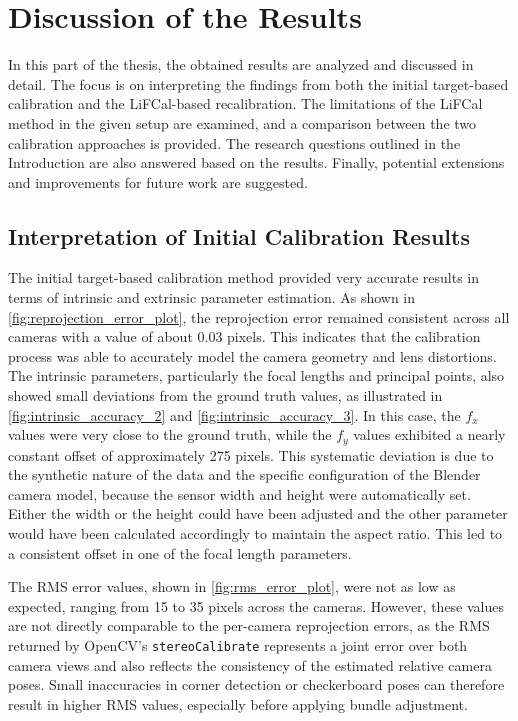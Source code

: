 \documentclass[12pt]{scrartcl}
\begin{document}
\newpage 
\section{Discussion of the Results} \label{Chapter 5}

In this part of the thesis, the obtained results are analyzed and discussed in detail. The focus is on interpreting the findings from both the initial target-based calibration and the LiFCal-based recalibration. The limitations of the LiFCal method in the given setup are examined, and a comparison between the two calibration approaches is provided. The research questions outlined in the Introduction are also answered based on the results. Finally, potential extensions and improvements for future work are suggested.

\subsection{Interpretation of Initial Calibration Results}

The initial target-based calibration method provided very accurate results in terms of intrinsic and extrinsic parameter estimation. As shown in \autoref{fig:reprojection_error_plot}, the reprojection error remained consistent across all cameras with a value of about 0.03 pixels. This indicates that the calibration process was able to accurately model the camera geometry and lens distortions. The intrinsic parameters, particularly the focal lengths and principal points, also showed small deviations from the ground truth values, as illustrated in \autoref{fig:intrinsic_accuracy_2} and \autoref{fig:intrinsic_accuracy_3}. In this case, the $f_x$ values were very close to the ground truth, while the $f_y$ values exhibited a nearly constant offset of approximately 275 pixels. This systematic deviation is due to the synthetic nature of the data and the specific configuration of the Blender camera model, because the sensor width and height were automatically set. Either the width or the height could have been adjusted and the other parameter would have been calculated accordingly to maintain the aspect ratio. This led to a consistent offset in one of the focal length parameters. 
\newline 

The RMS error values, shown in \autoref{fig:rms_error_plot}, were not as low as expected, ranging from 15 to 35 pixels across the cameras. However, these values are not directly comparable to the per-camera reprojection errors, as the RMS returned by OpenCV's \texttt{stereoCalibrate} represents a joint error over both camera views and also reflects the consistency of the estimated relative camera poses. Small inaccuracies in corner detection or checkerboard poses can therefore result in higher RMS values, especially before applying bundle adjustment.
\newline
\end{document}
